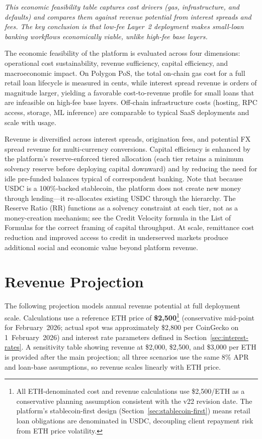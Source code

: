 \documentclass[12pt,a4paper]{report}
\begin{document}
\vspace{2pt}
\noindent\textit{\small This economic feasibility table captures cost drivers (gas, infrastructure, and defaults) and compares them against revenue potential from interest spreads and fees. The key conclusion is that low-fee Layer~2 deployment makes small-loan banking workflows economically viable, unlike high-fee base layers.}

The economic feasibility of the platform is evaluated across four dimensions: operational cost sustainability, revenue sufficiency, capital efficiency, and macroeconomic impact. On Polygon PoS, the total on-chain gas cost for a full retail loan lifecycle is measured in cents, while interest spread revenue is orders of magnitude larger, yielding a favorable cost-to-revenue profile for small loans that are infeasible on high-fee base layers. Off-chain infrastructure costs (hosting, RPC access, storage, ML inference) are comparable to typical SaaS deployments and scale with usage.

Revenue is diversified across interest spreads, origination fees, and potential FX spread revenue for multi-currency conversions. Capital efficiency is enhanced by the platform's reserve-enforced tiered allocation (each tier retains a minimum solvency reserve before deploying capital downward) and by reducing the need for idle pre-funded balances typical of correspondent banking. Note that because USDC is a 100\%-backed stablecoin, the platform does not create new money through lending---it re-allocates existing USDC through the hierarchy. The Reserve Ratio (RR) functions as a solvency constraint at each tier, not as a money-creation mechanism; see the Credit Velocity formula in the List of Formulas for the correct framing of capital throughput. At scale, remittance cost reduction and improved access to credit in underserved markets produce additional social and economic value beyond platform revenue.

\section{Revenue Projection}

The following projection models annual revenue potential at full deployment scale. Calculations use a reference ETH price of \textbf{\$2,500}\footnote{All ETH-denominated cost and revenue calculations use \$2{,}500/ETH as a conservative planning assumption consistent with the v22 revision date. The platform's stablecoin-first design (Section~\ref{sec:stablecoin-first}) means retail loan obligations are denominated in USDC, decoupling client repayment risk from ETH price volatility.} (conservative mid-point for February~2026; actual spot was approximately \$2,800 per CoinGecko on 1~February~2026) and interest rate parameters defined in Section~\ref{sec:interest-rates}. A sensitivity table showing revenue at \$2,000, \$2,500, and \$3,000 per ETH is provided after the main projection; all three scenarios use the same 8\% APR and loan-base assumptions, so revenue scales linearly with ETH price.
\end{document}

